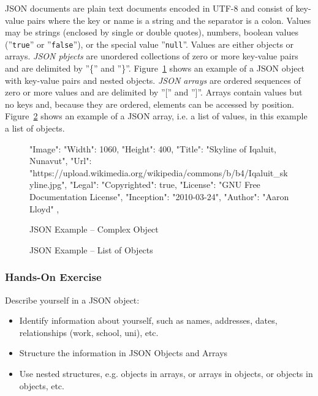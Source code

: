 JSON documents are plain text documents encoded in UTF-8 and consist of key-value pairs where the key or name is a string and the separator is a colon. Values may be strings (enclosed by single or double quotes), numbers, boolean values (''\texttt{true}'' or ''\texttt{false}''), or the special value ''\texttt{null}''. Values are either objects or arrays. \emph{JSON pbjects} are unordered collections of zero or more key-value pairs and are delimited by ''\{'' and ''\}''. Figure~\ref{fig:json1} shows an example of a JSON object with key-value pairs and nested objects. \emph{JSON arrays} are ordered sequences of zero or more values and are delimited by ''['' and '']''. Arrays contain values but no keys and, because they are ordered, elements can be accessed by position. Figure~\ref{fig:jason2} shows an example of a JSON array, i.e. a list of values, in this example a list of objects.

\begin{figure}[h]
\begin{jsoncode}
{
  "Image": {
    "Width": 1060,
    "Height": 400,
    "Title": "Skyline of Iqaluit, Nunavut",
    "Url": 
"https://upload.wikimedia.org/wikipedia/commons/b/b4/Iqaluit_skyline.jpg",
    "Legal": {
      "Copyrighted": true,
      "License": "GNU Free Documentation License",
      "Inception": "2010-03-24",
      "Author": "Aaron Lloyd"
     },
  }
}
\end{jsoncode}
\caption{JSON Example -- Complex Object}
\label{fig:json1}
\end{figure}

\begin{figure}
\begin{jsoncode}
\end{jsoncode}
\caption{JSON Example -- List of Objects}
\label{fig:jason2}
\end{figure}

\begin{tcolorbox}[colback=code]
\subsubsection*{Hands-On Exercise} 

Describe yourself in a JSON object:
\begin{itemize}
	\item Identify information about yourself, such as names, addresses, dates, relationships (work, school, uni), etc.
	\item Structure the information in JSON Objects and Arrays 
	\item Use nested structures, e.g. objects in arrays, or arrays in objects, or objects in objects, etc.
\end{itemize}
\end{tcolorbox}

